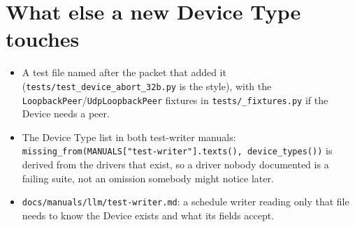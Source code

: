 \section{What else a new Device Type touches}

\begin{itemize}
  \item A test file named after the packet that added it
    (\texttt{tests/\allowbreak{}test\_\allowbreak{}device\_\allowbreak{}abort\_\allowbreak32b.py} is the style), with the
    \texttt{LoopbackPeer}/\texttt{UdpLoopbackPeer} fixtures in \texttt{tests/\_fixtures.py} if the
    Device needs a peer.
  \item The Device Type list in both test-writer manuals:
    \texttt{missing\_\allowbreak{}from(MANUALS["test-writer"].texts(), device\_\allowbreak{}types())} is derived from the
    drivers that exist, so a driver nobody documented is a failing suite, not an omission somebody
    might notice later.
  \item \texttt{docs/\allowbreak{}manuals/\allowbreak{}llm/\allowbreak{}test-writer.md}: a schedule writer reading only that file needs to
    know the Device exists and what its fields accept.
\end{itemize}

